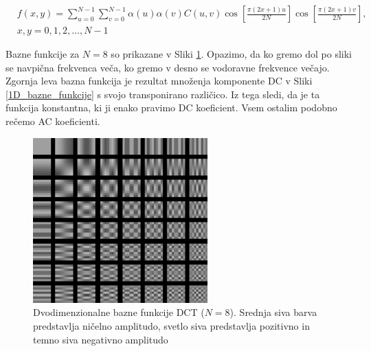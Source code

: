 \documentclass[a4paper,12pt,openright]{book}
\begin{document}
\begin{equation}
    \begin{aligned}
    &f(x,y) = \sum_{u=0}^{N-1}\sum_{v=0}^{N-1} \alpha(u) \alpha(v) C(u,v)
    \cos\left[\frac{\pi(2x+1)u}{2N}\right]
    \cos\left[\frac{\pi(2x+1)v}{2N}\right],  \\
    &x,y = 0,1,2,\ldots,N-1
    \end{aligned}
\label{eq:2D-DCT-inverse}
\end{equation}

Bazne funkcije za \(N=8\) so prikazane v Sliki \ref{2D_bazne_funkcije}. Opazimo, da ko gremo dol po sliki se navpična frekvenca veča, ko gremo v desno se vodoravne frekvence večajo. Zgornja leva bazna funkcija je rezultat množenja komponente DC v Sliki \ref{1D_bazne_funkcije} s svojo transponirano različico. Iz tega sledi, da je ta funkcija konstantna, ki ji enako pravimo DC koeficient. Vsem ostalim podobno rečemo AC koeficienti.\par

\begin{figure}[ht] %
\begin{center}
\includegraphics[width=0.6\textwidth]{slike/bazne_funkcije_2D.pdf}
\end{center}
\caption{Dvodimenzionalne bazne funkcije DCT (\(N=8\)). Srednja siva barva predstavlja ničelno amplitudo, svetlo siva predstavlja pozitivno in temno siva negativno amplitudo}
\label{2D_bazne_funkcije}
\end{figure}
\end{document}
